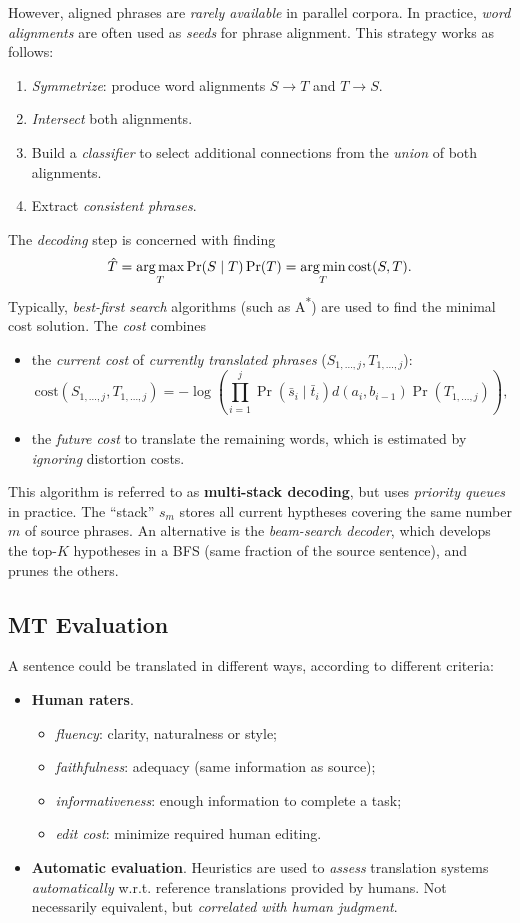 However, aligned phrases are \emph{rarely available} in parallel corpora.
In practice, \emph{word alignments} are often used as \emph{seeds} for phrase alignment.
This strategy works as follows:
\begin{enumerate}
	\item \emph{Symmetrize}: produce word alignments \(S \to T\) and \(T \to S\).
	\item \emph{Intersect} both alignments.
	\item Build a \emph{classifier} to select additional connections from the \emph{union} of both alignments.
	\item Extract \emph{consistent phrases}.
\end{enumerate}

The \emph{decoding} step is concerned with finding
\[
\hat{T} = \operatorname*{arg\,max}_{T} \Pr(S \mid T) \Pr(T) = \operatorname*{arg\,min}_{T} \mathrm{cost}(S, T).
\]
Typically, \emph{best-first search} algorithms (such as A\textsuperscript{*}) are used to find the minimal cost solution.
The \emph{cost} combines
\begin{itemize}
	\item the \emph{current cost} of \emph{currently translated phrases} (\(S_{1, \dots, j}, T_{1, \dots, j}\)):
	\[
	\mathrm{cost}(S_{1, \dots, j}, T_{1, \dots, j}) = -\log \left(\prod_{i = 1}^j \Pr(\bar{s}_i \mid \bar{t}_i) d(a_i, b_{i-1}) \Pr(T_{1, \dots, j})\right),
	\]
	\item the \emph{future cost} to translate the remaining words, which is estimated by \emph{ignoring} distortion costs.
\end{itemize}
This algorithm is referred to as \textbf{multi-stack decoding}, but uses \emph{priority queues} in practice.
The ``stack'' \(s_m\) stores all current hyptheses covering the same number \(m\) of source phrases.
An alternative is the \emph{beam-search decoder}, which develops the top-\(K\) hypotheses in a BFS (same fraction of the source sentence), and prunes the others.

\subsection{MT Evaluation}
A sentence could be translated in different ways, according to different criteria:
\begin{itemize}
	\item \textbf{Human raters}.
	\begin{itemize}
		\item \emph{fluency}: clarity, naturalness or style;
		\item \emph{faithfulness}: adequacy (same information as source);
		\item \emph{informativeness}: enough information to complete a task;
		\item \emph{edit cost}: minimize required human editing.
	\end{itemize}
	\item \textbf{Automatic evaluation}.
	Heuristics are used to \emph{assess} translation systems \emph{automatically} w.r.t. reference translations provided by humans.
	Not necessarily equivalent, but \emph{correlated with human judgment}.
\end{itemize}

